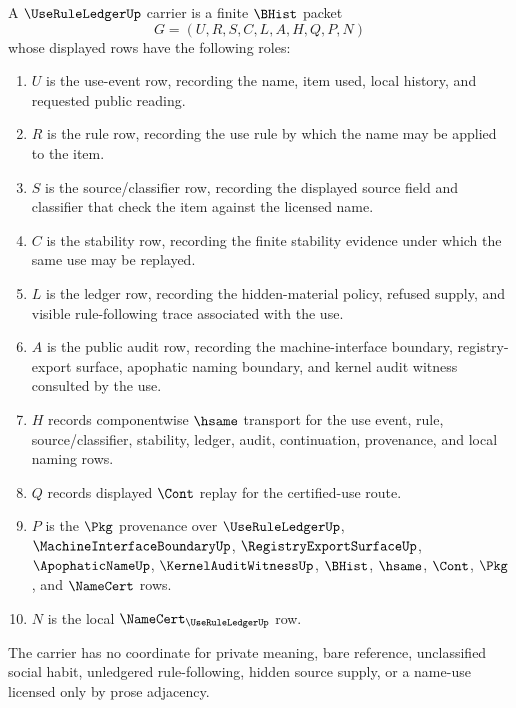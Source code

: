 \begin{definition}
\label{def:use-rule-ledger-carrier}
A $\UseRuleLedgerUp$ carrier is a finite $\BHist$ packet
$$
G=(U,R,S,C,L,A,H,Q,P,N)
$$
whose displayed rows have the following roles:
\begin{enumerate}
\item $U$ is the use-event row, recording the name, item used, local history, and requested public reading.
\item $R$ is the rule row, recording the use rule by which the name may be applied to the item.
\item $S$ is the source/classifier row, recording the displayed source field and classifier that check the item against the licensed name.
\item $C$ is the stability row, recording the finite stability evidence under which the same use may be replayed.
\item $L$ is the ledger row, recording the hidden-material policy, refused supply, and visible rule-following trace associated with the use.
\item $A$ is the public audit row, recording the machine-interface boundary, registry-export surface, apophatic naming boundary, and kernel audit witness consulted by the use.
\item $H$ records componentwise $\hsame$ transport for the use event, rule, source/classifier, stability, ledger, audit, continuation, provenance, and local naming rows.
\item $Q$ records displayed $\Cont$ replay for the certified-use route.
\item $P$ is the $\Pkg$ provenance over $\UseRuleLedgerUp$, $\MachineInterfaceBoundaryUp$, $\RegistryExportSurfaceUp$, $\ApophaticNameUp$, $\KernelAuditWitnessUp$, $\BHist$, $\hsame$, $\Cont$, $\Pkg$, and $\NameCert$ rows.
\item $N$ is the local $\NameCert_{\UseRuleLedgerUp}$ row.
\end{enumerate}
The carrier has no coordinate for private meaning, bare reference, unclassified social habit, unledgered rule-following, hidden source supply, or a name-use licensed only by prose adjacency.
\end{definition}

